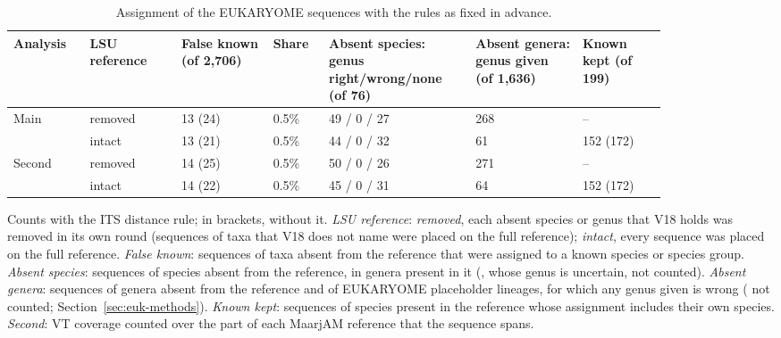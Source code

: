 \begin{table}[htbp]\centering
\begin{threeparttable}
\caption{Assignment of the \EkTestN{} EUKARYOME sequences with the rules as fixed in advance.}
\label{tab:euk}
\footnotesize\setlength{\tabcolsep}{4pt}
\begin{tabular}{L{0.10\linewidth}L{0.12\linewidth}L{0.12\linewidth}L{0.07\linewidth}L{0.19\linewidth}L{0.14\linewidth}L{0.11\linewidth}}
\toprule
Analysis & LSU reference & False known (of 2{,}706) & Share & Absent species: genus right/wrong/none (of 76) & Absent genera: genus given (of 1{,}636) & Known kept (of 199)\\
\midrule
Main & removed & 13 (24) & 0.5\% & 49 / 0 / 27 & 268 & --\\
 & intact & 13 (21) & 0.5\% & 44 / 0 / 32 & 61 & 152 (172)\\
Second & removed & 14 (25) & 0.5\% & 50 / 0 / 26 & 271 & --\\
 & intact & 14 (22) & 0.5\% & 45 / 0 / 31 & 64 & 152 (172)\\
\bottomrule
\end{tabular}
\begin{tablenotes}\footnotesize
\item Counts with the ITS distance rule; in brackets, without it. \emph{LSU reference}: \emph{removed}, each absent species or genus that V18 holds was removed in its own round (sequences of taxa that V18 does not name were placed on the full reference); \emph{intact}, every sequence was placed on the full reference. \emph{False known}: sequences of taxa absent from the reference that were assigned to a known species or species group. \emph{Absent species}: sequences of species absent from the reference, in genera present in it (, whose genus is uncertain, not counted). \emph{Absent genera}: sequences of genera absent from the reference and of EUKARYOME placeholder lineages, for which any genus given is wrong ( not counted; Section~\ref{sec:euk-methods}). \emph{Known kept}: sequences of species present in the reference whose assignment includes their own species. \emph{Second}: VT coverage counted over the part of each MaarjAM reference that the sequence spans.
\end{tablenotes}
\end{threeparttable}
\end{table}
